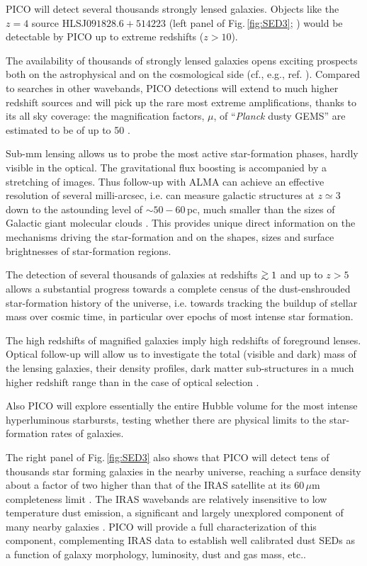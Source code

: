 \documentclass[11pt,a4paper]{article}
\def\simgt{\mathrel{\rlap{\lower 3pt\hbox{$\sim$}} \raise2.0pt\hbox{$>$}}}
\begin{document}
PICO will detect several thousands strongly lensed galaxies. Objects like the $z=4$ source HLSJ$091828.6+514223$ (left panel of Fig.\,\ref{fig:SED3}; \cite{Combes2012}) would be detectable by PICO up to extreme redshifts ($z>10$).

The availability of thousands of strongly lensed galaxies opens exciting prospects both on the astrophysical and on the cosmological side (cf., e.g., ref. \cite{Treu2010}). Compared to searches in other wavebands, PICO detections will extend to much higher redshift sources \cite[most optically-selected strongly lensed galaxies are at $z<1$, cf. Fig.\,7 of ref. ][]{Treu2010} and will pick up the rare most extreme amplifications, thanks to its all sky coverage: the magnification factors, $\mu$, of ``\textit{Planck} dusty GEMS'' are estimated to be of up to 50 \cite{Canameras2015}.

Sub-mm lensing allows us to probe the most active star-formation phases, hardly visible in the optical. The gravitational flux boosting is accompanied by a stretching of images. Thus follow-up  with ALMA can achieve an effective resolution of several milli-arcsec, i.e. can measure galactic structures at $z\simeq 3$ down to the astounding level of $\sim 50-60\,$pc, much smaller than the sizes of Galactic giant molecular clouds \cite{Canameras2017ALMA}. This provides unique direct information on the mechanisms driving the star-formation  and on the shapes, sizes and surface brightnesses of star-formation regions.

The detection of several thousands of galaxies at redshifts $\simgt 1$ and up to $z>5$ allows a substantial progress towards a complete census of the dust-enshrouded star-formation history of the universe, i.e. towards tracking the buildup of stellar mass over cosmic time, in particular over epochs of most intense star formation.

The high redshifts of magnified galaxies imply high redshifts of  foreground lenses. Optical follow-up will allow us to investigate the total (visible and dark) mass of the lensing galaxies, their density profiles, dark matter sub-structures in a much higher redshift range than in the case of optical selection \cite{Canameras2017lens}.

Also PICO will explore essentially the entire Hubble volume for the most intense hyperluminous starbursts, testing whether there are physical limits to the star-formation rates of galaxies.

The right panel of Fig.\,\ref{fig:SED3} also shows that PICO will detect tens of thousands star forming galaxies in the nearby universe, reaching a surface density about a factor of two higher than that of the IRAS satellite at its $60\,\mu$m completeness limit \cite{RowanRobinson1991}. The IRAS
wavebands  are relatively insensitive to low temperature dust emission,
a significant and largely unexplored component of many nearby galaxies \cite{Planck2011nearby_gal}. PICO will provide a full characterization of this component, complementing IRAS data to establish well calibrated dust SEDs as a function of galaxy morphology, luminosity, dust and gas mass, etc..
\end{document}
